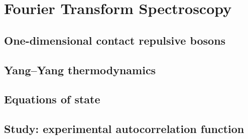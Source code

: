 
\renewcommand{\thechapter}{4}

\chapter{Fourier Transform Spectroscopy}

\section{One-dimensional contact repulsive bosons}

\section{Yang--Yang thermodynamics}

\section{Equations of state}

\section{Study: experimental autocorrelation function}


